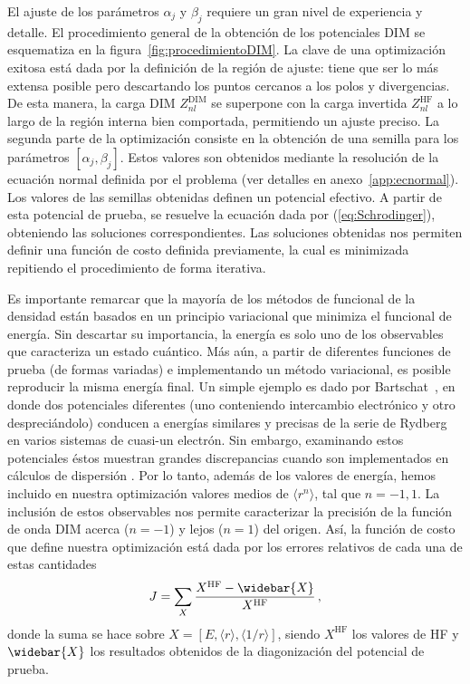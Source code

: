 El ajuste de los parámetros $\alpha_{j}$ y $\beta_{j}$ requiere un gran 
nivel de experiencia y detalle. El procedimiento general de la 
obtención de los potenciales DIM se esquematiza en la 
figura~\ref{fig:procedimientoDIM}. La clave de una optimización exitosa está 
dada por la definición de la región de ajuste: tiene que ser lo más 
extensa posible pero descartando los puntos cercanos a los polos y 
divergencias. De esta manera, la carga DIM $Z_{nl}^{\mathrm{DIM}}$ 
se superpone con la carga invertida $Z_{nl}^{\mathrm{HF}}$ a lo largo 
de la región interna bien comportada, permitiendo un ajuste preciso. 
La segunda parte de la optimización consiste en la obtención de una
semilla para los parámetros $\left[\alpha_{j},\beta_{j}\right]$.
Estos valores son obtenidos mediante la resolución de la ecuación 
normal definida por el problema (ver detalles en anexo~\ref{app:ecnormal}).
Los valores de las semillas obtenidas definen un potencial efectivo. 
A partir de esta potencial de prueba, se resuelve la ecuación dada por
(\ref{eq:Schrodinger}), obteniendo las soluciones correspondientes. 
Las soluciones obtenidas nos permiten definir una función de costo 
definida previamente, la cual es minimizada repitiendo el procedimiento
de forma iterativa. 

Es importante remarcar que la mayoría de los métodos de funcional de 
la densidad están basados en un principio variacional que minimiza el
funcional de energía. Sin descartar su importancia, la energía es solo
uno de los observables que caracteriza un estado cuántico. Más aún, a 
partir de diferentes funciones de prueba (de formas variadas) e 
implementando un método variacional, es posible reproducir la misma 
energía final. Un simple ejemplo es dado por 
Bartschat~\cite{Albright:93,Bartschat:96}, en donde dos potenciales
diferentes (uno conteniendo intercambio electrónico y otro despreciándolo)
conducen a energías similares y precisas de la serie de Rydberg en 
varios sistemas de cuasi-un electrón. Sin embargo, examinando estos 
potenciales éstos muestran grandes discrepancias cuando son implementados
en cálculos de dispersión \cite{BartschatBray:96}. Por lo tanto, además
de los valores de energía, hemos incluido en nuestra optimización 
valores medios de $\langle r^{n} \rangle$, tal que $n=-1,1$. La inclusión
de estos observables nos permite caracterizar la precisión de la función
de onda DIM acerca ($n=-1$) y lejos ($n=1$) del origen. Así, la función 
de costo que define nuestra optimización está dada por los errores 
relativos de cada una de estas cantidades
\begin{equation}
J=\sum_X \frac{X^{\mathrm{HF}}-\widebar{X}}{X^{\mathrm{HF}}}\,,
\end{equation}
donde la suma se hace sobre $X=\left[E,\langle r \rangle,\langle 1/r \rangle\right]$,
siendo $X^{\mathrm{HF}}$ los valores de HF y $\widebar{X}$ los 
resultados obtenidos de la diagonización del potencial de prueba. 

